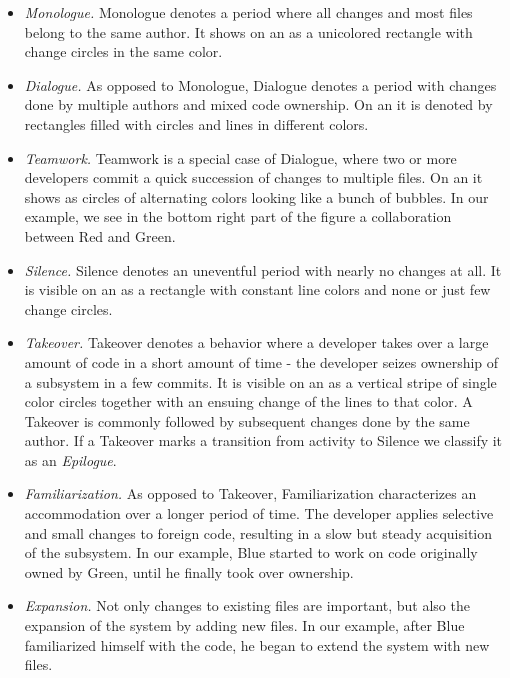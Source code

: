 \documentclass[10pt]{book}
\begin{document}
\begin{itemize}

\item \emph{Monologue.} Monologue denotes a period where all changes and most files belong to the same author. It shows on an \omap as a unicolored rectangle with change circles in the same color.

\item \emph{Dialogue.} As opposed to Monologue, Dialogue denotes a period with changes done by multiple authors and mixed code ownership. On an \omap it is denoted by rectangles filled with circles and lines in different colors.

\item \emph{Teamwork.} Teamwork is a special case of Dialogue, where two or more developers commit a quick succession of changes to multiple files. On an \omap it shows as circles of alternating colors looking like a bunch of bubbles. In our example, we see in the bottom right part of the figure a collaboration between Red and Green.

\item \emph{Silence.} Silence denotes an uneventful period with nearly no changes at all. It is visible on an \omap as a rectangle with constant line colors and none or just few change circles.

\item \emph{Takeover.} Takeover denotes a behavior where a developer takes over a large amount of code in a short amount of time \-- \ie the developer seizes ownership of a subsystem in a few commits. It is visible on an \omap as a vertical stripe of single color circles together with an ensuing change of the lines to that color. A Takeover is commonly followed by subsequent changes done by the same author. If a Takeover marks a transition from activity to Silence we classify it as an \emph{Epilogue}.

\item \emph{Familiarization.} As opposed to Takeover, Familiarization characterizes an accommodation over a longer period of time. The developer applies selective and small changes to foreign code, resulting in a slow but steady acquisition of the subsystem. In our example, Blue started to work on code originally owned by Green, until he finally took over ownership.

\item \emph{Expansion.} Not only changes to existing files are important, but also the expansion of the system by adding new files. In our example, after Blue familiarized himself with the code, he began to extend the system with new files.


\end{itemize}
\end{document}
